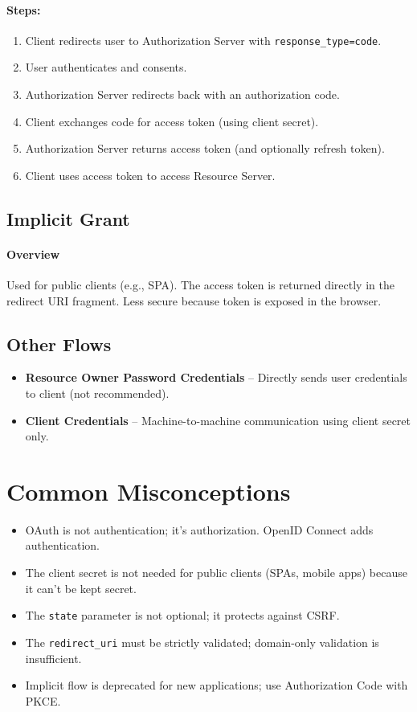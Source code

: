 \documentclass[12pt,a4paper]{article}
\begin{document}
\paragraph{Steps:}
\begin{enumerate}
    \item Client redirects user to Authorization Server with \texttt{response\_type=code}.
    \item User authenticates and consents.
    \item Authorization Server redirects back with an authorization code.
    \item Client exchanges code for access token (using client secret).
    \item Authorization Server returns access token (and optionally refresh token).
    \item Client uses access token to access Resource Server.
\end{enumerate}

\subsection{Implicit Grant}
\paragraph{Overview} Used for public clients (e.g., SPA). The access token is returned directly in the redirect URI fragment. Less secure because token is exposed in the browser.

\subsection{Other Flows}
\begin{itemize}
    \item \textbf{Resource Owner Password Credentials} – Directly sends user credentials to client (not recommended).
    \item \textbf{Client Credentials} – Machine-to-machine communication using client secret only.
\end{itemize}

\section{Common Misconceptions}
\begin{itemize}
    \item OAuth is not authentication; it's authorization. OpenID Connect adds authentication.
    \item The client secret is not needed for public clients (SPAs, mobile apps) because it can't be kept secret.
    \item The \texttt{state} parameter is not optional; it protects against CSRF.
    \item The \texttt{redirect\_uri} must be strictly validated; domain-only validation is insufficient.
    \item Implicit flow is deprecated for new applications; use Authorization Code with PKCE.
\end{itemize}
\end{document}
